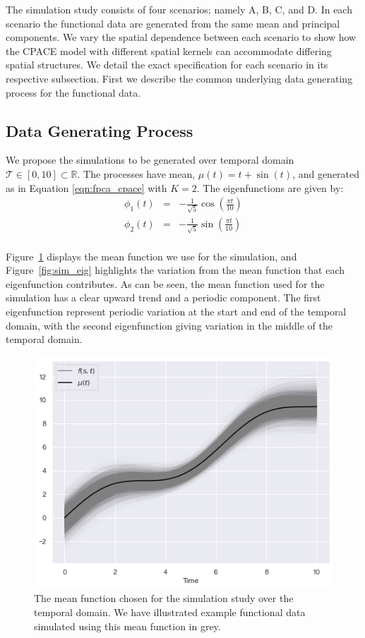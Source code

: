 The simulation study consists of four scenarios; namely A, B, C, and D.
In each scenario the functional data are generated from the same mean and principal components.
We vary the spatial dependence between each scenario to show how the CPACE model with different spatial kernels can accommodate differing spatial structures.
We detail the exact specification for each scenario in its respective subsection.
First we describe the common underlying data generating process for the functional data.

\subsection{Data Generating Process \label{ssec:dgp_sim}}
We propose the simulations to be generated over temporal domain $\mathcal{T} \in \left[0, 10\right] \subset \mathbb{R}$.
The processes have mean, $\mu\left(t\right) = t + \sin\left(t\right)$, and generated as in Equation \eqref{eqn:fpca_cpace} with $K=2$.
The eigenfunctions are given by: 
\begin{eqnarray}
	\phi_1\left(t\right) &=& -\frac{1}{\sqrt{5}}\cos\left(\frac{\pi t}{10}\right) \nonumber \\ 
	\phi_2\left(t\right) &=& -\frac{1}{\sqrt{5}}\sin\left(\frac{\pi t}{10}\right) \nonumber \\
\end{eqnarray}

Figure~\ref{fig:sim_mean} displays the mean function we use for the simulation, and Figure~\ref{fig:sim_eig} highlights the variation from the mean function that each eigenfunction contributes.
As can be seen, the mean function used for the simulation has a clear upward trend and a periodic component.
The first eigenfunction represent periodic variation at the start and end of the temporal domain, with the second eigenfunction giving variation in the middle of the temporal domain.

\begin{figure}
	\centering
	\includegraphics[width=\textwidth]{mean_sim}
	\caption[The simulation studies mean function.]{The mean function chosen for the simulation study over the temporal domain. We have illustrated example functional data simulated using this mean function in grey.}
	\label{fig:sim_mean}
\end{figure}

